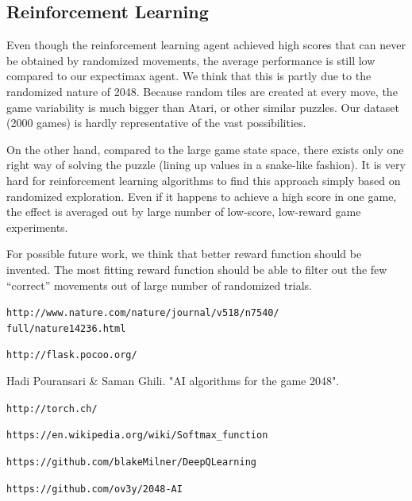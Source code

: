 \documentclass[9pt,twocolumn]{article}
\begin{document}
\subsection{Reinforcement Learning}

Even though the reinforcement learning agent achieved high scores that can never be obtained by randomized movements, the average performance is still low compared to our expectimax agent. We think that this is partly due to the randomized nature of 2048. Because random tiles are created at every move, the game variability is much bigger than Atari, or other similar puzzles. Our dataset (2000 games) is hardly representative of the vast possibilities.

On the other hand, compared to the large game state space, there exists only one right way of solving the puzzle (lining up values in a snake-like fashion). It is very hard for reinforcement learning algorithms to find this approach simply based on randomized exploration. Even if it happens to achieve a high score in one game, the effect is averaged out by large number of low-score, low-reward game experiments.

For possible future work, we think that better reward function should be invented. The most fitting reward function should be able to filter out the few “correct” movements out of large number of randomized trials.

\begin{thebibliography}{9}

 \texttt{http://www.nature.com/nature/journal/v518/n7540/\\full/nature14236.html}

 \texttt{http://flask.pocoo.org/}

 Hadi Pouransari & Saman Ghili. "AI algorithms for the game 2048".

 \texttt{http://torch.ch/}

 \texttt{https://en.wikipedia.org/wiki/Softmax\_function}

 \texttt{https://github.com/blakeMilner/DeepQLearning}

 \texttt{https://github.com/ov3y/2048-AI}

\end{thebibliography}
\end{document}

